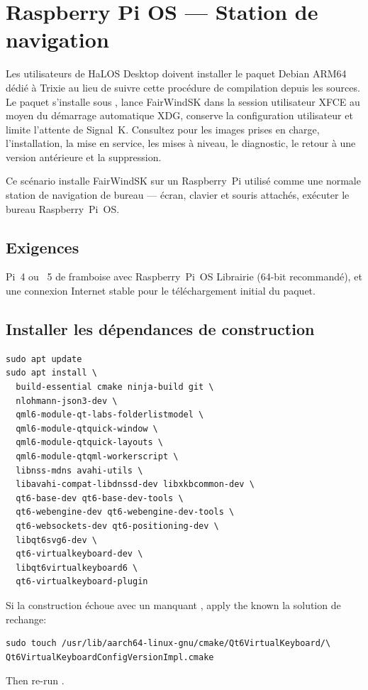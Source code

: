 \section{Raspberry Pi OS --- Station de navigation}
\label{app:rpi-station}

Les utilisateurs de HaLOS Desktop doivent installer le paquet Debian ARM64
dédié à Trixie au lieu de suivre cette procédure de compilation depuis les
sources. Le paquet s'installe sous , lance FairWindSK dans la session
utilisateur XFCE au moyen du démarrage automatique XDG, conserve la
configuration utilisateur et limite l'attente de Signal~K. Consultez
 pour les images prises en charge, l'installation, la mise
en service, les mises à niveau, le diagnostic, le retour à une version
antérieure et la suppression.

Ce scénario installe FairWindSK sur un Raspberry~Pi utilisé comme une normale
station de navigation de bureau --- écran, clavier et souris attachés,
exécuter le bureau Raspberry~Pi~OS.

\subsection{Exigences}

Pi~4 ou ~5 de framboise avec Raspberry~Pi~OS Librairie (64-bit recommandé),
et une connexion Internet stable pour le téléchargement initial du paquet.

\subsection{Installer les dépendances de construction}

\begin{lstlisting}
sudo apt update
sudo apt install \
  build-essential cmake ninja-build git \
  nlohmann-json3-dev \
  qml6-module-qt-labs-folderlistmodel \
  qml6-module-qtquick-window \
  qml6-module-qtquick-layouts \
  qml6-module-qtqml-workerscript \
  libnss-mdns avahi-utils \
  libavahi-compat-libdnssd-dev libxkbcommon-dev \
  qt6-base-dev qt6-base-dev-tools \
  qt6-webengine-dev qt6-webengine-dev-tools \
  qt6-websockets-dev qt6-positioning-dev \
  libqt6svg6-dev \
  qt6-virtualkeyboard-dev \
  libqt6virtualkeyboard6 \
  qt6-virtualkeyboard-plugin
\end{lstlisting}

\begin{notebox}
Si la construction échoue avec un manquant
, apply the known
la solution de rechange:
\begin{lstlisting}
sudo touch /usr/lib/aarch64-linux-gnu/cmake/Qt6VirtualKeyboard/\
Qt6VirtualKeyboardConfigVersionImpl.cmake
\end{lstlisting}
Then re-run \code{cmake}.
\end{notebox}

